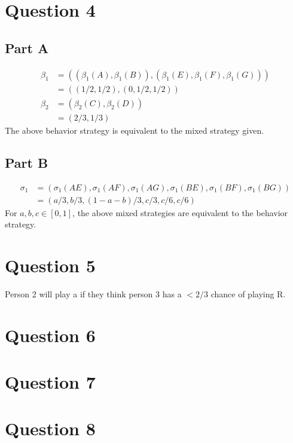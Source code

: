 \documentclass[11pt]{article} %
\begin{document}
\section{Question 4}
\subsection{Part A}
\begin{align*}
\beta_1 &= \left((\beta_1(A),\beta_1(B)),(\beta_1(E),\beta_1(F),\beta_1(G))\right)\\
&= ((1/2,1/2),(0,1/2,1/2))\\
\beta_2 &= (\beta_2(C),\beta_2(D))\\
&= (2/3,1/3)
\end{align*}
The above behavior strategy is equivalent to the mixed strategy given.
\subsection{Part B}
\begin{align*}
\sigma_1 &= \left(\sigma_1(AE),\sigma_1(AF),\sigma_1(AG),\sigma_1(BE),\sigma_1(BF),\sigma_1(BG) \right) \\
&= (a/3,b/3,(1-a-b)/3,c/3,c/6,c/6)
\end{align*}
For $a,b,c \in [0,1]$, the above mixed strategies are equivalent to the behavior strategy.
\section{Question 5}
Person 2 will play a if they think person 3 has a $<2/3$ chance of playing R. 
\section{Question 6}
\section{Question 7}
\section{Question 8}
\end{document}
